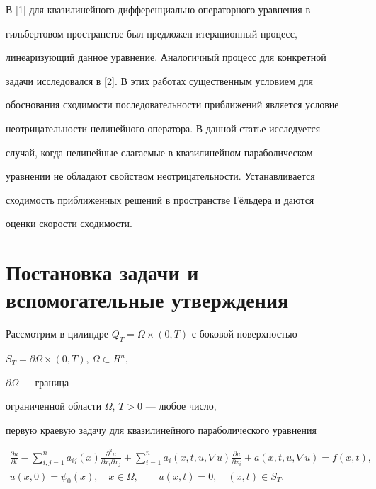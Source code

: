 \maketitle








В [1] для квазилинейного дифференциально-операторного уравнения в


гильбертовом пространстве был предложен итерационный процесс,


линеаризующий данное уравнение. Аналогичный процесс для конкретной


задачи исследовался в [2]. В этих работах существенным условием для


обоснования сходимости последовательности приближений является условие


неотрицательности нелинейного оператора. В данной статье исследуется


случай, когда нелинейные слагаемые в квазилинейном параболическом


уравнении не обладают свойством неотрицательности. Устанавливается


сходимость приближенных решений в пространстве Г\"ельдера и даются


оценки скорости сходимости.





\section{Постановка задачи и вспомогательные утверждения}





Рассмотрим в цилиндре $Q_T=\Omega\times(0,T)$ с боковой поверхностью


$S_T=\partial\Omega\times(0,T)$, $\Omega\subset R^n$,


$\partial\Omega$ --- граница


ограниченной области $\Omega$, $T>0$ --- любое число,


первую краевую задачу для квазилинейного параболического уравнения


\begin{gather}


\frac{\partial u}{\partial t}-\sum^n_{i,j=1}a_{ij}(x)


\frac{\partial^2u}{\partial x_i\partial x_j}+


\sum^n_{i=1}a_i(x,t,u,\nabla u)


\frac{\partial u}{\partial x_i}+a(x,t,u,\nabla u)=


f(x,t),\\


u(x,0)=\psi_0(x),\quad x\in\Omega,\qquad u(x,t)=0,\quad


(x,t)\in S_T.


\end{gather}





